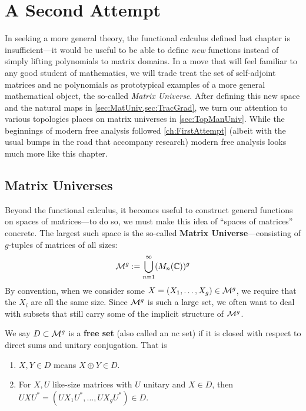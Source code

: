 \chapter{A Second Attempt}\label{ch:SecondAttempt}

In seeking a more general theory, the functional calculus defined last chapter
is insufficient---it would be useful to be able to define \emph{new} functions
instead of simply lifting polynomials to matrix domains. In a move that will
feel familiar to any good student of mathematics, we will trade treat the
set of self-adjoint matrices and nc polynomials
as prototypical examples of a more general mathematical
object, the so-called \emph{Matrix Universe}.
After defining this new space and the natural maps in
\cref{sec:MatUniv,sec:TracGrad}, we turn our attention to various topologies
places on matrix universes in \cref{sec:TopManUniv}. While the beginnings of
modern free
analysis followed \cref{ch:FirstAttempt} (albeit with the usual bumps in the
road that accompany research) modern free analysis looks much more like this
chapter.

\section{Matrix Universes}%
\label{sec:MatUniv}

Beyond the functional calculus, it becomes useful to construct general functions
on spaces of matrices---to do so, we must make this idea of ``spaces of
matrices'' concrete. The largest such space is the so-called \textbf{Matrix
  Universe}---consisting of \(g\)-tuples of matrices of all sizes:
\[
  \mathcal{M}^g := \bigcup_{n=1}^\infty (M_n(\mathbb{C}))^g
\]
By convention, when we consider some
\(X = \left( X_1, \dots , X_g \right) \in \mathcal{M}^g\), we require that the \(X_i\)
are all the same size. Since \(\mathcal{M}^g\) is such a large set, we often want to
deal with subsets that still carry some of the implicit structure of \(\mathcal{M}^g\).
\begin{definition}
  \label{def:FreeSet}
  We say \(D \subset \mathcal{M}^g\) is a \textbf{free set} (also called an nc set) if it is closed with respect
  to direct sums and unitary conjugation. That is
  \begin{enumerate}
    \item \(X,Y \in D \) means \(X\oplus Y \in D\).
    \item For \(X,U\) like-size matrices with \(U\) unitary and \(X \in D\),
          then \(U X U^* = \left( UX_1U^*, \dots , UX_g U^*  \right) \in D \).
  \end{enumerate}
\end{definition}

